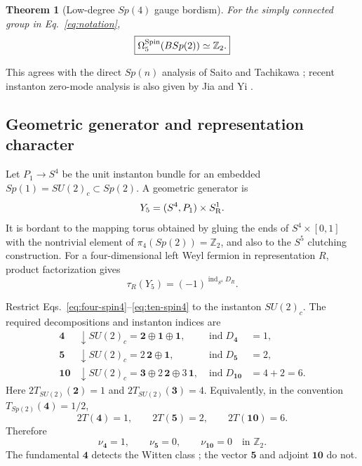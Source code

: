 \documentclass[11pt]{article}
\newtheorem{theorem}{Theorem}[section]
\theoremstyle{definition}
\theoremstyle{remark}
\newcommand{\ZZ}{\mathbb Z}
\newcommand{\ind}{\operatorname{ind}}
\begin{document}
\begin{theorem}[Low-degree \(Sp(4)\) gauge bordism]
For the simply connected group in Eq.~\eqref{eq:notation},
\begin{equation}
 \boxed{\Omega_5^{\rm Spin}(BSp(2))\simeq\ZZ_2.}
 \label{eq:omega5-result}
\end{equation}
\end{theorem}
This agrees with the direct \(Sp(n)\) analysis of Saito and Tachikawa
\cite{SaitoTachikawa2025}; recent instanton zero-mode analysis is also
given by Jia and Yi \cite{JiaYi2024}.

\subsection{Geometric generator and representation character}

Let \(P_1\to S^4\) be the unit instanton bundle for an embedded
\(Sp(1)=SU(2)_c\subset Sp(2)\).  A geometric generator is
\begin{equation}
 Y_5=(S^4,P_1)\times S^1_{\rm R}.
 \label{eq:geometric-generator}
\end{equation}
It is bordant to the mapping torus obtained by gluing the ends of
\(S^4\times[0,1]\) with the nontrivial element of
\(\pi_4(Sp(2))=\ZZ_2\), and also to the \(S^5\) clutching construction.
For a four-dimensional left Weyl fermion in representation \(R\), product
factorization gives
\begin{equation}
 \tau_R(Y_5)=(-1)^{\ind_{S^4}D_R}.
 \label{eq:product-eta-index}
\end{equation}

Restrict Eqs.~\eqref{eq:four-spin4}--\eqref{eq:ten-spin4} to the instanton
\(SU(2)_c\).  The required decompositions and instanton indices are
\begin{align}
 \bm4&\downarrow SU(2)_c=\bm2\oplus\bm1\oplus\bm1,
 &\ind D_{\bm4}&=1,
 \label{eq:index-four}\\
 \bm5&\downarrow SU(2)_c=2\,\bm2\oplus\bm1,
 &\ind D_{\bm5}&=2,
 \label{eq:index-five}\\
 \bm{10}&\downarrow SU(2)_c=\bm3\oplus2\,\bm2\oplus3\,\bm1,
 &\ind D_{\bm{10}}&=4+2=6.
 \label{eq:index-ten}
\end{align}
Here \(2T_{SU(2)}(\bm2)=1\) and
\(2T_{SU(2)}(\bm3)=4\).  Equivalently, in the convention
\(T_{Sp(2)}(\bm4)=1/2\),
\begin{equation}
 2T(\bm4)=1,
 \qquad2T(\bm5)=2,
 \qquad2T(\bm{10})=6.
 \label{eq:dynkin-mod2}
\end{equation}
Therefore
\begin{equation}
 \nu_{\bm4}=1,
 \qquad \nu_{\bm5}=0,
 \qquad \nu_{\bm{10}}=0
 \quad\text{in }\ZZ_2.
 \label{eq:characters}
\end{equation}
The fundamental \(\bm4\) detects the Witten class
\cite{Witten1982,WangWenWitten2019}; the vector \(\bm5\) and adjoint
\(\bm{10}\) do not.
\end{document}
